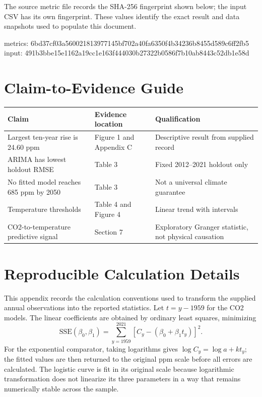 \documentclass{mcmthesis}
\begin{document}
\begin{appendices}
The source metric file records the SHA-256 fingerprint shown below; the input CSV has its own fingerprint. These values identify the exact result and data snapshots used to populate this document.
\begin{center}
\small metrics: 6bd37cf03a560021813977145bf702a40fa6350f4b34236b8455d589c6ff2fb5\\
input: 491b3bbe15e1162a19cc1e163f444030b27322b0586f7b10ab8443c52db1e58d
\end{center}

\section{Claim-to-Evidence Guide}

\begin{table}[H]
\centering
\small
\begin{tabularx}{\textwidth}{p{}p{}X}
\toprule
Claim & Evidence location & Qualification \\ \midrule
\midrule
Largest ten-year rise is 24.60 ppm & Figure 1 and Appendix C & Descriptive result from supplied record \\
ARIMA has lowest holdout RMSE & Table 3 & Fixed 2012--2021 holdout only \\
No fitted model reaches 685 ppm by 2050 & Table 3 & Not a universal climate guarantee \\
Temperature thresholds & Table 4 and Figure 4 & Linear trend with intervals \\
CO2-to-temperature predictive signal & Section 7 & Exploratory Granger statistic, not physical causation \\
\bottomrule
\end{tabularx}
\end{table}

\section{Reproducible Calculation Details}
This appendix records the calculation conventions used to transform the supplied annual observations into the reported statistics. Let $t=y-1959$ for the CO2 models. The linear coefficients are obtained by ordinary least squares, minimizing
\begin{equation}
 \mathrm{SSE}(\beta_0,\beta_1)=\sum_{y=1959}^{2021}
 \left[C_y-(\beta_0+\beta_1t_y)\right]^2.
\end{equation}
For the exponential comparator, taking logarithms gives $\log C_y=\log a+kt_y$; the fitted values are then returned to the original ppm scale before all errors are calculated. The logistic curve is fit in its original scale because logarithmic transformation does not linearize its three parameters in a way that remains numerically stable across the sample.


\end{appendices}
\end{document}
